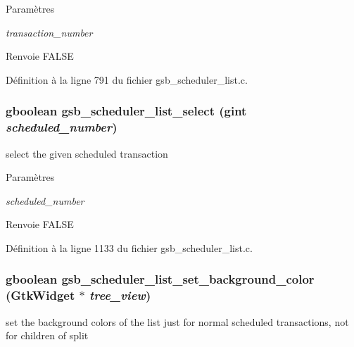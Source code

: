 \begin{DoxyParams}{Paramètres}
\item[{\em transaction\_\-number}]\end{DoxyParams}
\begin{DoxyReturn}{Renvoie}
FALSE 
\end{DoxyReturn}


Définition à la ligne 791 du fichier gsb\_\-scheduler\_\-list.c.

\subsubsection[{gsb\_\-scheduler\_\-list\_\-select}]{\setlength{\rightskip}{0pt plus 5cm}gboolean gsb\_\-scheduler\_\-list\_\-select (gint {\em scheduled\_\-number})}\label{gsb__scheduler__list_8h_acbc7a6e13ae89beb5afb56a3e8bba495}
select the given scheduled transaction


\begin{DoxyParams}{Paramètres}
\item[{\em scheduled\_\-number}]\end{DoxyParams}
\begin{DoxyReturn}{Renvoie}
FALSE 
\end{DoxyReturn}


Définition à la ligne 1133 du fichier gsb\_\-scheduler\_\-list.c.

\subsubsection[{gsb\_\-scheduler\_\-list\_\-set\_\-background\_\-color}]{\setlength{\rightskip}{0pt plus 5cm}gboolean gsb\_\-scheduler\_\-list\_\-set\_\-background\_\-color (GtkWidget $\ast$ {\em tree\_\-view})}\label{gsb__scheduler__list_8h_a4348c22b2bc74713a8615c749c61f4d8}
set the background colors of the list just for normal scheduled transactions, not for children of split


